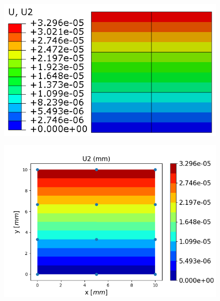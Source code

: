 \documentclass[11pt]{article}
\begin{document}
\begin{figure}[H]
	\centering
	\begin{minipage}{.5\textwidth}
		\centering
		\includegraphics[width=1\linewidth]{EME23U2.png}
		\label{EME23U2}
	\end{minipage}%
	\begin{minipage}{.6\textwidth}
		\centering
		\includegraphics[width=1\linewidth]{EME23U2_IGA.png}
		\label{EME23U2_IGA}
	\end{minipage}
\end{figure}
\end{document}
